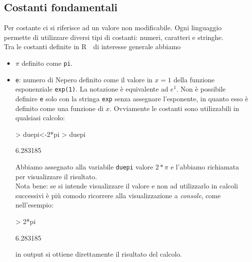\documentclass[onecolumn,11pt]{book}
\newcommand{\rpr}{\textsf{R}~}
\begin{document}
\subsection{Costanti fondamentali}
Per costante ci si riferisce ad un valore non modificabile. Ogni linguaggio permette di utilizzare diversi tipi di costanti: numeri, caratteri e stringhe.\\  Tra le costanti definite in \rpr~di interesse generale abbiamo
\begin{itemize}
\item{}$\pi$ definito come \texttt{pi}.
\item{}\texttt{e}: numero di Nepero 
definito come il  valore  in $x=1$ della funzione esponenziale \texttt{exp(1)}. La notazione \`e equivalente ad $e^1$.
Non \`e possibile definire \texttt{e} solo con la stringa \texttt{exp} senza assegnare l'esponente, in quanto esso \`e definito come una funzione di $x$.  
Ovviamente le costanti sono utilizzabili in qualsiasi calcolo:
\begin{Schunk}
\begin{Sinput}
> duepi<-2*pi
> duepi
\end{Sinput}
\begin{Soutput}
[1] 6.283185
\end{Soutput}
\end{Schunk}
Abbiamo assegnato alla variabile \texttt{duepi}  valore $2*\pi$  e l'abbiamo richiamata per visualizzare il risultato.\\
Nota bene: se si intende visualizzare il valore e non ad utilizzarlo in calcoli successivi \`e pi\`u comodo ricorrere alla visualizzazione a \emph{console}, come nell'esempio:
\begin{Schunk}
\begin{Sinput}
> 2*pi
\end{Sinput}
\begin{Soutput}
[1] 6.283185
\end{Soutput}
\end{Schunk}
in output si ottiene direttamente il risultato del calcolo.  
\end{itemize}
 

 
\end{document}
